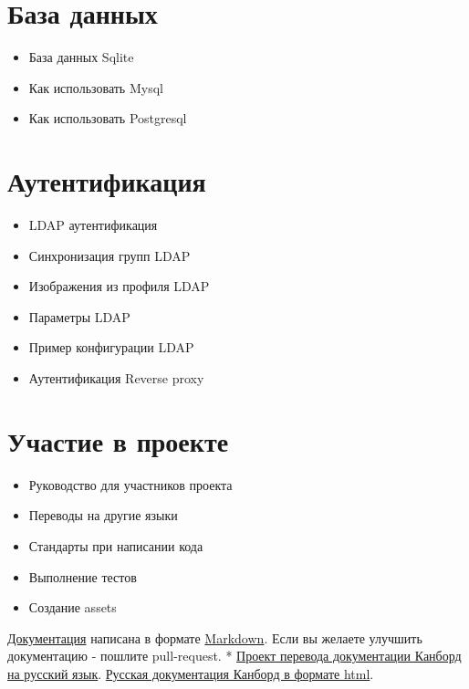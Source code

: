\documentclass[letterpaper,10pt,russian]{sphinxmanual}
\begin{document}
\section{База данных}
\label{index:database}\begin{itemize}
\item {} 
База данных Sqlite

\item {} 
Как использовать Mysql

\item {} 
Как использовать Postgresql

\end{itemize}


\section{Аутентификация}
\label{index:authentication}\begin{itemize}
\item {} 
LDAP аутентификация

\item {} 
Синхронизация групп LDAP

\item {} 
Изображения из профиля LDAP

\item {} 
Параметры LDAP

\item {} 
Пример конфигурации LDAP

\item {} 
Аутентификация Reverse proxy

\end{itemize}


\section{Участие в проекте}
\label{index:contributors}\begin{itemize}
\item {} 
Руководство для участников проекта

\item {} 
Переводы на другие языки

\item {} 
Стандарты при написании кода

\item {} 
Выполнение тестов

\item {} 
Создание assets

\end{itemize}

\href{https://github.com/fguillot/kanboard/tree/master/doc}{Документация} написана в формате \href{https://ru.wikipedia.org/wiki/Markdown}{Markdown}. Если вы желаете улучшить документацию - пошлите pull-request.
* \href{https://github.com/hairetdin/kanboard-doc-ru}{Проект перевода документации Канборд на русский язык}. \href{http://kanboard.ru/doc/}{Русская документация Канборд в формате html}.



\renewcommand{\indexname}{Алфавитный указатель}
\printindex
\end{document}
